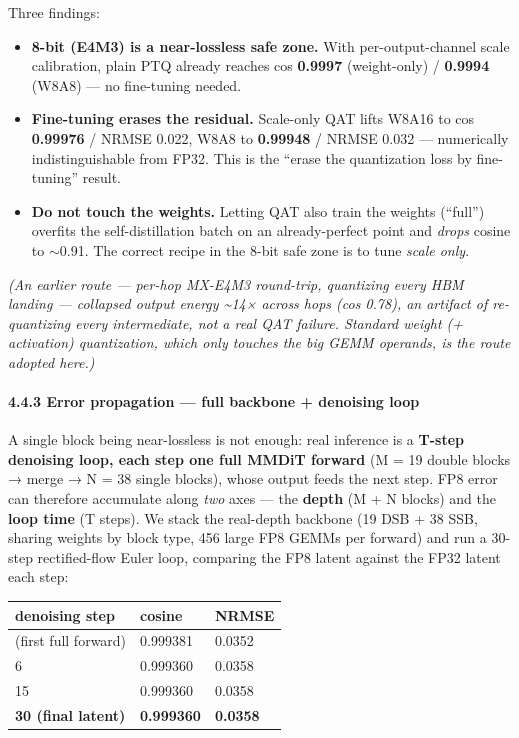 \documentclass[
  10pt,
]{article}
\newcounter{none} %
\providecommand{\tightlist}{%
  \setlength{\itemsep}{0pt}\setlength{\parskip}{0pt}}
\begin{document}
Three findings:

\begin{itemize}
\tightlist
\item
  \textbf{8-bit (E4M3) is a near-lossless safe zone.} With per-output-channel
  scale calibration, plain PTQ already reaches cos \textbf{0.9997}
  (weight-only) / \textbf{0.9994} (W8A8) --- no fine-tuning needed.
\item
  \textbf{Fine-tuning erases the residual.} Scale-only QAT lifts W8A16 to
  cos \textbf{0.99976} / NRMSE 0.022, W8A8 to \textbf{0.99948} / NRMSE
  0.032 --- numerically indistinguishable from FP32. This is the
  ``erase the quantization loss by fine-tuning'' result.
\item
  \textbf{Do not touch the weights.} Letting QAT also train the weights
  (``full'') overfits the self-distillation batch on an already-perfect
  point and \emph{drops} cosine to \(\sim\)0.91. The correct recipe in the
  8-bit safe zone is to tune \emph{scale only}.
\end{itemize}

\emph{(An earlier route --- per-hop MX-E4M3 round-trip, quantizing every
HBM landing --- collapsed output energy \textasciitilde14× across hops
(cos 0.78), an artifact of re-quantizing every intermediate, not a real
QAT failure. Standard weight (+ activation) quantization, which only
touches the big GEMM operands, is the route adopted here.)}

\paragraph{4.4.3 Error propagation --- full backbone + denoising
loop}\label{error-prop}

A single block being near-lossless is not enough: real inference is a
\textbf{T-step denoising loop, each step one full MMDiT forward} (M = 19
double blocks → merge → N = 38 single blocks), whose output feeds the next
step. FP8 error can therefore accumulate along \emph{two} axes — the
\textbf{depth} (M + N blocks) and the \textbf{loop time} (T steps). We
stack the real-depth backbone (19 DSB + 38 SSB, sharing weights by block
type, 456 large FP8 GEMMs per forward) and run a 30-step rectified-flow
Euler loop, comparing the FP8 latent against the FP32 latent each step:

{\def\LTcaptype{none}
\begin{longtable}[]{@{}lll@{}}
\toprule\noalign{}
denoising step & cosine & NRMSE \\
\midrule\noalign{}
\endhead
\bottomrule\noalign{}
\endlastfoot
1 (first full forward) & 0.999381 & 0.0352 \\
6 & 0.999360 & 0.0358 \\
15 & 0.999360 & 0.0358 \\
\textbf{30 (final latent)} & \textbf{0.999360} & \textbf{0.0358} \\
\end{longtable}
}
\end{document}
